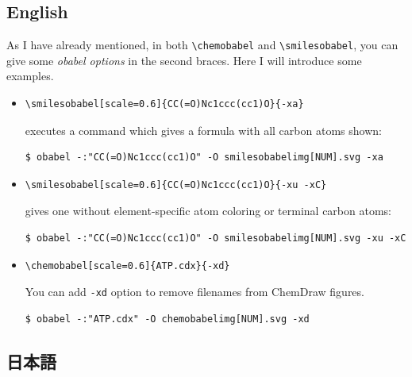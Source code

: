 \documentclass[12pt]{jsarticle}
\begin{document}
\subsection{English}

As I have already mentioned, in both \verb|\chemobabel| and \verb|\smilesobabel|, you can give some \textit{obabel options} in the second braces.
Here I will introduce some examples.
\begin{itemize}
\item
\begin{verbatim}
\smilesobabel[scale=0.6]{CC(=O)Nc1ccc(cc1)O}{-xa}
\end{verbatim}
executes a command which gives a formula with all carbon atoms shown:
\begin{verbatim}
$ obabel -:"CC(=O)Nc1ccc(cc1)O" -O smilesobabelimg[NUM].svg -xa
\end{verbatim}
\item
\begin{verbatim}
\smilesobabel[scale=0.6]{CC(=O)Nc1ccc(cc1)O}{-xu -xC}
\end{verbatim}
gives one without element-specific atom coloring or terminal carbon atoms:
\begin{verbatim}
$ obabel -:"CC(=O)Nc1ccc(cc1)O" -O smilesobabelimg[NUM].svg -xu -xC
\end{verbatim}
\item
\begin{verbatim}
\chemobabel[scale=0.6]{ATP.cdx}{-xd}
\end{verbatim}
You can add \texttt{-xd} option to remove filenames from ChemDraw figures.
\begin{verbatim}
$ obabel -:"ATP.cdx" -O chemobabelimg[NUM].svg -xd
\end{verbatim}
\end{itemize}

\subsection{日本語}
\end{document}
